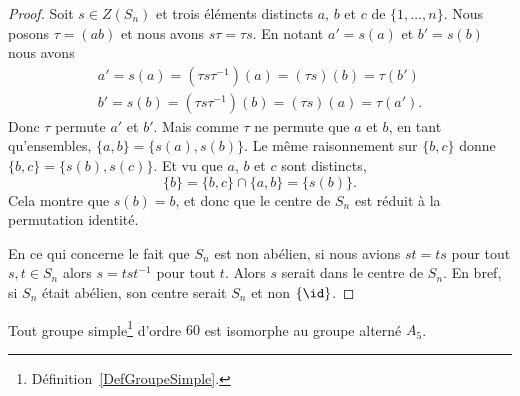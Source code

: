 \begin{proof}
    Soit \( s\in Z(S_n)\) et trois éléments distincts \( a\),  \( b\) et \( c\) de \( \{ 1,\ldots, n \}\). Nous posons \( \tau=(ab)\) et nous avons \( s\tau=\tau s\). En notant \( a'=s(a)\) et \( b'=s(b)\) nous avons
    \begin{subequations}
        \begin{align}
            a'=s(a)=(\tau s\tau^{-1})(a)=(\tau s)(b)=\tau(b')\\
            b'=s(b)=(\tau s\tau^{-1})(b)=(\tau s)(a)=\tau(a').
        \end{align}
    \end{subequations}
    Donc \( \tau\) permute \( a'\) et \( b'\). Mais comme \( \tau\) ne permute que \( a\) et \( b\), en tant qu'ensembles, \( \{ a,b \}=\{ s(a), s(b) \}\). Le même raisonnement sur \( \{ b,c \}\) donne $\{ b,c \}=\{ s(b),s(c) \}$. Et vu que \( a\), \( b\) et \( c\) sont distincts,
    \begin{equation}
        \{ b \}=\{ b,c \}\cap\{ a,b \}=\{ s(b) \}.
    \end{equation}
    Cela montre que \( s(b)=b\), et donc que le centre de \( S_n\) est réduit à la permutation identité.

    En ce qui concerne le fait que \( S_n\) est non abélien, si nous avions \( st=ts\) pour tout \( s,t\in S_n\) alors \( s=tst^{-1}\) pour tout \( t\). Alors \( s\) serait dans le centre de \( S_n\). En bref, si \( S_n\) était abélien, son centre serait \( S_n\) et non \( \{ \id \}\).

\end{proof}

\begin{proposition}        \label{PROPooUBIWooTrfCat}
    Tout groupe simple\footnote{Définition~\ref{DefGroupeSimple}.} d'ordre \( 60\) est isomorphe au groupe alterné \( A_5\).
\end{proposition}

